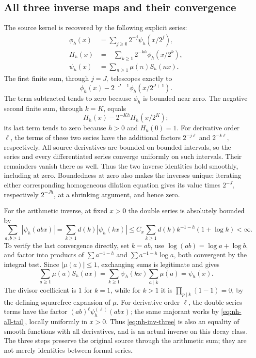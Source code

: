 \subsection{All three inverse maps and their convergence}

The source kernel is recovered by the following explicit series:
\begin{align}
 \phi_h(x)&=\sum_{j\ge0}2^{-j}\psi_h(x/2^j),\label{eq:nh-inv-one}\\
 H_h(x)&=-\sum_{k\ge1}2^{-kh}\phi_h(x/2^k),\label{eq:nh-inv-two}\\
 \psi_h(x)&=\sum_{n\ge1}\mu(n)S_h(nx).\label{eq:nh-inv-three}
\end{align}
The first finite sum, through \(j=J\), telescopes exactly to
\[
 \phi_h(x)-2^{-J-1}\phi_h(x/2^{J+1}).
\]
The term subtracted tends to zero because \(\phi_h\) is bounded near
zero. The negative second finite sum, through \(k=K\), equals
\[
 H_h(x)-2^{-Kh}H_h(x/2^K);
\]
its last term tends to zero because \(h>0\) and \(H_h(0)=1\).
For derivative order \(\ell\), the terms of these two series have the
additional factors \(2^{-j\ell}\) and \(2^{-k\ell}\), respectively.
All source derivatives are bounded on bounded intervals, so the series
and every differentiated series converge uniformly on such intervals.
Their remainders vanish there as well. Thus the two inverse identities
hold smoothly, including at zero. Boundedness at zero also makes the
inverses unique: iterating either corresponding homogeneous dilation
equation gives its value times \(2^{-J}\), respectively \(2^{-Jh}\),
at a shrinking argument, and hence zero.

For the arithmetic inverse, at fixed \(x>0\) the double series is
absolutely bounded by
\[
 \sum_{a,b\ge1}|\psi_h(abx)|
 =\sum_{k\ge1}d(k)|\psi_h(kx)|
 \le C_x\sum_{k\ge1}d(k)k^{-1-h}(1+\log k)<\infty.
\]
To verify the last convergence directly, set \(k=ab\), use
\(\log(ab)=\log a+\log b\), and factor into products of
\(\sum a^{-1-h}\) and \(\sum a^{-1-h}\log a\), both convergent
by the integral test. Since \(|\mu(a)|\le1\), exchanging sums is
legitimate and gives
\[
 \sum_{a\ge1}\mu(a)S_h(ax)
 =\sum_{k\ge1}\psi_h(kx)\sum_{a\mid k}\mu(a)=\psi_h(x).
\]
The divisor coefficient is \(1\) for \(k=1\), while for \(k>1\) it is
\(\prod_{p\mid k}(1-1)=0\), by the defining squarefree expansion of
\(\mu\). For derivative order \(\ell\), the double-series terms have
the factor \((ab)^\ell\psi_h^{(\ell)}(abx)\); the same majorant works
by \eqref{eq:nh-all-tail}, locally uniformly in \(x>0\).
Thus \eqref{eq:nh-inv-three} is also an equality of smooth functions
with all derivatives, and is an actual inverse on this decay class.
The three steps preserve the original source through the arithmetic
sum; they are not merely identities between formal series.

